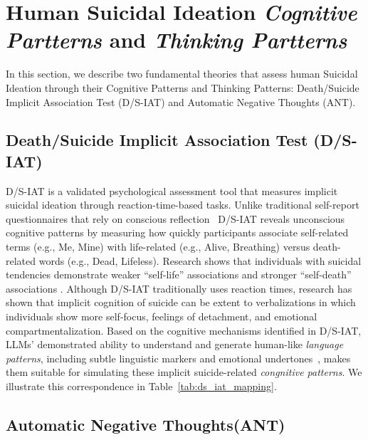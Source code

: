 \section{Human Suicidal Ideation \textit{Cognitive Partterns} and \textit{Thinking Partterns}}
\label{sec:partterns}

In this section, we describe two fundamental theories that assess human Suicidal Ideation through their Cognitive Patterns and Thinking Patterns: Death/Suicide Implicit Association Test (D/S-IAT) and Automatic Negative Thoughts (ANT).

\subsection{Death/Suicide Implicit Association Test (D/S-IAT)}
D/S-IAT is a validated psychological assessment tool \cite{test4,method} that measures implicit suicidal ideation through reaction-time-based tasks. Unlike traditional self-report questionnaires that rely on conscious reflection~\cite{Deming2021,TERRILL2021113737} D/S-IAT reveals unconscious cognitive patterns by measuring how quickly participants associate self-related terms (e.g., Me, Mine) with life-related (e.g., Alive, Breathing) versus death-related words (e.g., Dead, Lifeless). Research shows that individuals with suicidal tendencies demonstrate weaker ``self-life'' associations and stronger ``self-death'' associations \cite{method2}. Although D/S-IAT traditionally uses reaction times, research \cite{suicide1, method3, method4} has shown that implicit cognition of suicide can be extent to verbalizations in which individuals show more self-focus, feelings of detachment, and emotional compartmentalization. Based on the cognitive mechanisms identified in D/S-IAT, LLMs' demonstrated ability to understand and generate human-like \textit{language patterns}, including subtle linguistic markers and emotional undertones~\cite{NEURIPS2024_b0049c3f}, makes them suitable for simulating these implicit suicide-related \textit{congnitive patterns}. We illustrate this correspondence in Table~\ref{tab:ds_iat_mapping}.


\subsection{Automatic Negative Thoughts(ANT)}


